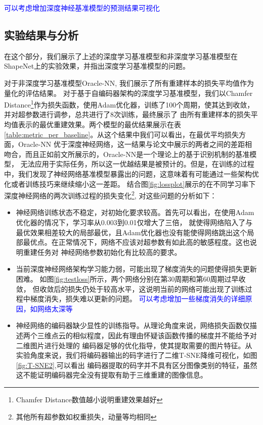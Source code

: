 \documentclass[bachelor, nocolorlinks, printoneside]{seuthesis} %
\newcommand\TODO[1]{\textcolor{blue}{#1}}
\begin{document}
\begin{Main}
\TODO{可以考虑增加深度神经基准模型的预测结果可视化}
\subsection{实验结果与分析}

在这个部分，我们展示了上述的深度学习基准模型和非深度学习基准模型在ShapeNet上的实验效果，并指出深度学习基准模型的问题。

对于非深度学习基准模型Oracle-NN, 我们展示了所有重建样本的损失平均值作为量化的评估结果。
对于基于自编码器架构的深度学习基准模型，我们以Chamfer Distance\footnote[2]{Chamfer Distance数值越小说明重建效果越好}作为损失函数，使用Adam优化器，训练了100个周期，使其达到收敛，并对超参数进行调参，总共进行了8次训练，最终展示了
由所有重建样本的损失平均值表示的最优重建效果。两个模型的最优结果展示在表\ref{table:metric_per_baseline}。从这个结果中我们可以看出，在最优平均损失方面，Oracle-NN
优于深度神经网络，这一结果与论文\cite{tatarchenko2019single}中展示的两者之间的差距相吻合，而且正如前文所展示的，Oracle-NN是一个理论上的基于识别机制的基准模型，
无法应用于实际任务，所以这一优越结果是被预计的。但是，在训练的过程中，我们发现了神经网络基准模型暴露出的问题，这意味着有可能通过一些架构优化或者训练技巧来继续缩小这一差距。
结合图\ref{fig:lossplot}展示的在不同学习率下深度神经网络的两次训练过程的损失变化\footnote[1]{其他所有超参数如权重损失，动量等均相同}, 对这些问题的分析如下：
\begin{itemize}
    \item 神经网络训练状态不稳定，对初始化要求较高。首先可以看出，在使用Adam优化器的情况下，学习率从0.003到0.01仅增大了三倍，
        就使得网络陷入了与最优效果相差较大的局部最优，且Adam优化器也没有能使得网络跳出这个局部最优点。在正常情况下，网络不应该对超参数有如此高的敏感程度。这也说明重建任务对
        神经网络参数初始化有比较高的要求。
    \item 当前深度神经网络架构学习能力弱，可能出现了梯度消失的问题使得损失更新困难。
    如图\ref{fig:testloss}所示，两个网络分别在第30周期和第60周期过早收敛，
    但收敛后的损失仍处于较高水平，这说明当前的网络可能出现了训练过程中梯度消失，损失难以更新的问题。
    \TODO{可以考虑增加一些梯度消失的详细原因，如网络太深等}
    \item 神经网络的编码器缺少显性的训练指导。从理论角度来说，网络损失函数仅描述两个三维点云的相似程度，因此有理由怀疑该函数传播的梯度并不能给予对二维图片进行处理的
    编码器足够的优化指导，使其提取需要的图片特征。从实验角度来说，我们将编码器输出的码字进行了二维T-SNE降维可视化，如图\ref{fig:T-SNE2},可以看出
    编码器提取的码字并不具有区分图像类别的特征，虽然这不能证明编码器完全没有提取有助于三维重建的图像信息。
\end{itemize}


\end{Main}
\end{document}
